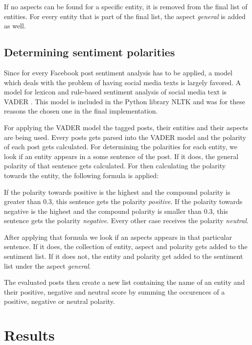 \documentclass[10pt,a4paper]{article}
\begin{document}
		If no aspects can be found for a specific entity, it is removed from the final list of entities.
		For every entity that is part of the final list, the aspect \textit{general} is added as well.

		\subsection{Determining sentiment polarities}
		\label{sec:sentimentpolarities}
		
		Since for every Facebook post sentiment analysis has to be applied, a model which deals with the problem of having social media texts is largely favored. A model for lexicon and rule-based sentiment analysis of social media text is VADER \cite{vader}. This model is included in the Python library NLTK and was for these reasons the chosen one in the final implementation. 
		
		For applying the VADER model the tagged posts, their entities and their aspects are being used. Every posts gets parsed into the VADER model and the polarity of each post gets calculated. For determining the polarities for each entity, we look if an entity appears in a some sentence of the post. If it does, the general polarity of that sentence gets calculated. For then calculating the polarity towards the entity, the following formula is applied:
		
		If the polarity towards positive is the highest and the compound polarity is greater than 0.3, this sentence gets the polarity \textit{positive}. If the polarity towards negative is the highest and the compound polarity is smaller than 0.3, this sentence gets the polarity \textit{negative}. Every other case receives the polarity \textit{neutral}.
		
		After applying that formula we look if an aspects appears in that particular sentence. If it does, the collection of entity, aspect and polarity gets added to the sentiment list. If it does not, the entity and polarity get added to the sentiment list under the aspect \textit{general}.
		
		The evaluated posts then create a new list containing the name of an entity and their positive, negative and neutral score by summing the occurences of a positive, negative or neutral polarity.
		
	\section{Results}
	\label{sec:results}
	
\end{document}
